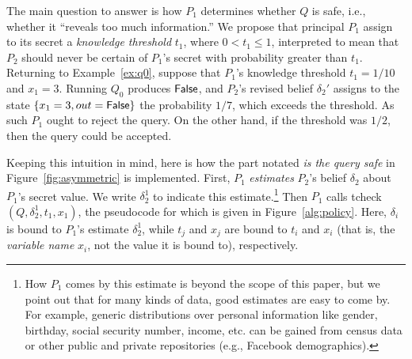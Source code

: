 \documentclass[10pt]{sigplanconf}
\newcommand{\mwh}[1]{\textcolor{purple}{MWH -- #1}}
\newcommand{\pxm}[1]{\textcolor{red}{PM -- #1}}
\newcommand{\mwh}[1]{}
\newcommand{\pxm}[1]{}
\newcommand{\polc}{\textsf{tcheck}}
\begin{document}
The main question to answer is how $P_1$ determines whether $Q$ is
safe, i.e., whether it ``reveals too much information.''
We propose that principal $P_1$ assign to its secret a \emph{knowledge
  threshold} $t_1$, where $0 < t_1 \leq 1$, interpreted to mean that
$P_2$ should never be certain of $P_1$'s secret with probability
greater than $t_1$.  Returning to Example~\ref{ex:q0}, suppose that
$P_1$'s knowledge threshold $t_1 = 1/10$ and $x_1 = 3$. Running $Q_0$
produces $\mathsf{False}$, and $P_2$'s revised belief $\delta_2'$ assigns to
the state $\{ x_1 = 3, out = \mathsf{False} \}$ the probability $1/7$, which
exceeds the threshold.  As such $P_1$ ought to reject
the query.  On the other hand, if the threshold was $1/2$, then the
query could be accepted.

Keeping this intuition in mind, here is how the part notated \emph{is
  the query safe} in Figure~\ref{fig:asymmetric} is implemented.
First, $P_1$ \emph{estimates} $P_2$'s belief $\delta_2$ about $P_1$'s
secret value. We write $\delta^1_2$ to indicate this
estimate.\footnote{How $P_1$ comes by this estimate is beyond the
  scope of this paper, but we point out that for many kinds of data,
  good estimates are easy to come by.  For example, generic
  distributions over personal information like gender, birthday,
  social security number, income, etc. can be gained from census data
  or other public and private repositories (e.g., Facebook
  demographics).} %
  Then $P_1$ calls
\polc$(Q,\delta^1_2,t_1,x_1)$, the pseudocode for which is given in
Figure~\ref{alg:policy}.  Here, $\delta_i$ is bound to $P_1$'s
estimate $\delta^1_2$, while $t_j$ and $x_j$ are bound to $t_i$ and
$x_i$ (that is, the \emph{variable name} $x_i$, not the value it is
bound to), respectively.
\end{document}
